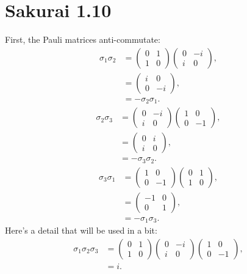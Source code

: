 \documentclass[
a4paper,
10pt,
twoside,
]{article}
\begin{document}
\section{Sakurai 1.10}
First, the Pauli matrices anti-commutate:
\begin{align}
	\sigma_1 \sigma_2 &= \begin{pmatrix}
		0&1\\1&0
	\end{pmatrix}\begin{pmatrix}
		0&-i\\i&0
	\end{pmatrix},
	\label{eq: anti-commute_first}\\
	&= \begin{pmatrix}
		i&0\\0&-i
	\end{pmatrix},\\
	&= -\sigma_2\sigma_1.
\end{align}
\begin{align}
	\sigma_2 \sigma_3 &= \begin{pmatrix}
		0&-i\\i&0
	\end{pmatrix}\begin{pmatrix}
		1&0\\0&-1
	\end{pmatrix},\\
	&= \begin{pmatrix}
		0&i\\i&0
	\end{pmatrix},\\
	&= -\sigma_3\sigma_2.
\end{align}
\begin{align}
	\sigma_3 \sigma_1 &= \begin{pmatrix}
		1&0\\0&-1
	\end{pmatrix}\begin{pmatrix}
		0&1\\1&0
	\end{pmatrix},\\
	&= \begin{pmatrix}
		-1&0\\0&1
	\end{pmatrix},\\
	&= -\sigma_1\sigma_3.
	\label{eq: anti-commute_last}
\end{align}
Here's a detail that will be used in a bit:
\begin{align}
	\sigma_1\sigma_2\sigma_3 &= \begin{pmatrix}
		0&1\\1&0
	\end{pmatrix}\begin{pmatrix}
		0&-i\\i&0
	\end{pmatrix}\begin{pmatrix}
		1&0\\0&-1
	\end{pmatrix},\\
	&= i.
	\label{eq: pseudoscalar}
\end{align}
\end{document}
